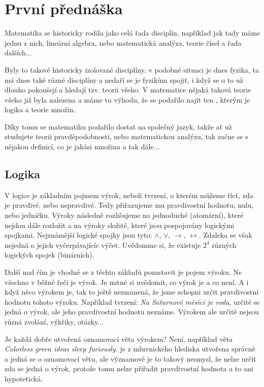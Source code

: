 \section{První přednáška}
Matematika se historicky rodila jako celá řada disciplín, například jak tady máme jednu
z nich, lineární algebra, nebo matematická analýza, teorie čísel a řada dalších...

Byly to takové historicky izolované disciplíny, v podobné situaci je dnes fyzika, ta
má dnes také různé disciplíny a nedaří se je fyzikům spojit, i když se o to už
dlouho pokoušejí a hledají tzv. teorii všeho. V matematice nějaká taková teorie všeho již
byla nalezena a máme tu výhodu, že se podařilo najít ten ,
kterým je logika a teorie množin.

Díky tomu se matematiku podařilo dostat na společný jazyk, takže ať už studujete
teorii pra\-vdě\-po\-dob\-no\-sti, nebo matematickou analýzu, tak začne se s nějakou
definicí, co je jakási množina a tak dále...

\subsection{Logika}
V logice je základním pojmem výrok, neboli tvrzení, o kterém můžeme říct, zda je pravdivé,
nebo nepravdivé. Tedy přiřazujeme mu pravdivostní hodnotu, nulu, nebo jedničku. Výroky následně
rozlišujeme na jednoduché (atomární), které nejdou dále rozložit a na výroky složité, které
jsou pospojovány logickými spojkami. Nejznámější logické spojky jsou tyto: $\wedge$, $\vee$,
$\rightarrow$, $\leftrightarrow$. Zdaleka se však nejedná o jejich vyčerpávajícíc výčet.
Uvědomme si, že existuje $2^4$ různých logických spojek (binárních).

Další nad čím je vhodné se z těchto základů pozastavit je pojem výroku. Ne všechno v běžné řeči
je výrok. Je nutné si uvědomit, co výrok je a co není. A i když něco výrokem je, tak to
ještě nezmanená, že jsme schopni určit pravdivostní hodnotu tohoto výroku. Například tvrzení:
\textit{Na Saturnově měsíci je voda}, určitě se jedná o výrok, ale jeho pravdivostní hodnotu neznáme.
Výrokem ale určitě nejsou různá zvolání, výkřiky, otázky...

Je každá dobře utvořená oznamovací věta výrokem? Není, například věta \textit{Colorless green ideas
sleep furiously.} je z mluvnického hlediska utvořena správně a jedná se o oznamovací větu, ale
významově je to takový nesmysl, že nelze určit zda se jedná o výrok, protože tomu nelze přiřadit
pravdivostní hodnota a to ani hypotetická.

